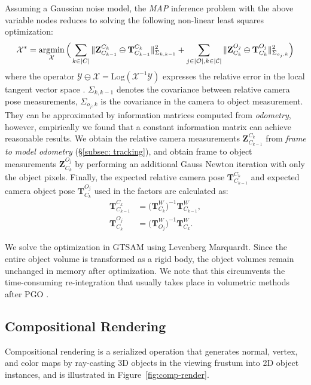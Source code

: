 Assuming a Gaussian noise model, the \textit{MAP} inference problem with the above variable nodes reduces to solving the following non-linear least squares optimization:
\begin{align}
    \mathcal{X}^* = \operatorname*{\arg\!\min}_{\mathcal{X}} \Big( \sum_{k \in |C|} \|  \mathbf{Z}^{C_k}_{C_{k-1}} \ominus \mathbf{T}^{C_k}_{C_{k-1}} \|_{\Sigma_{k,k-1}}^2 + \sum_{j \in |\mathcal{O}|, k \in |\mathcal{C}|} \| \mathbf{Z}^{O_j}_{C_k} \ominus \mathbf{T}^{O_j}_{C_k} \|_{\Sigma_{o_j, k}}^2 \Big)
\end{align}
where the operator $ \mathcal{Y} \ominus \mathcal{X} = \text{Log}(\mathcal{X}^{-1} \mathcal{Y})$ expresses the relative error in the local tangent vector space \cite{solaMicroLieTheory2020}. $\Sigma_{k, k-1}$ denotes the covariance between relative camera pose measurements,  $\Sigma_{o_j, k}$ is the covariance in the camera to object measurement. They can be approximated by information matrices computed from \textit{odometry}, however, empirically we found that a constant information matrix can achieve reasonable results. We obtain the relative camera measurements $\mathbf{Z}^{C_k}_{C_{k-1}}$ from \textit{frame to model odometry} (\S\ref{subsec: tracking}), and obtain frame to object measurements $\mathbf{Z}^{O_j}_{C_k}$ by performing an additional Gauss Newton iteration with only the object pixels. Finally, the expected relative camera pose $\mathbf{T}^{C_k}_{C_{k-1}}$ and expected camera object pose $\mathbf{T}^{O_j}_{C_k}$ used in the factors are calculated as:
\begin{align}
    \mathbf{T}^{C_k}_{C_{k-1}} &= \bigg({\mathbf{T}^{W}_{C_k}}\bigg)^{-1} \mathbf{T}^{W}_{C_{k-1}}, \\
    \mathbf{T}^{O_j}_{C_k} &= \bigg({\mathbf{T}^{W}_{O_j}}\bigg)^{-1} \mathbf{T}^{W}_{C_k}.
\end{align}

We solve the optimization in GTSAM \cite{FactorGraphsGTSAM2019} using Levenberg Marquardt. Since the entire object volume is transformed as a rigid body, the object volumes remain unchanged in memory after optimization. We note that this circumvents the time-consuming re-integration that usually takes place in volumetric methods after PGO \cite{whelanElasticFusionDenseSLAM2015}.

\subsection{Compositional Rendering} \label{subsec: rendering}
Compositional rendering is a serialized operation that generates normal, vertex, and color maps by ray-casting 3D objects in the viewing frustum into 2D object instances, and is illustrated in Figure~\ref{fig:comp-render}.

